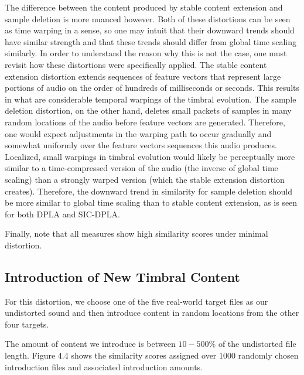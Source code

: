 \documentclass[a4paper,12pt]{report} 	%
\numberwithin{figure}{chapter}
\numberwithin{table}{chapter}
\numberwithin{equation}{chapter}
\begin{document}
\begin{flushleft}
The difference between the content produced by stable content extension and sample deletion is more nuanced however. Both of these distortions can be seen as time warping in a sense, so one may intuit that their downward trends should have similar strength and that these trends should differ from global time scaling similarly. In order to understand the reason why this is not the case, one must revisit how these distortions were specifically applied. The stable content extension distortion extends sequences of feature vectors that represent large portions of audio on the order of hundreds of milliseconds or seconds. This results in what are considerable temporal warpings of the timbral evolution. The sample deletion distortion, on the other hand, deletes small packets of samples in many random locations of the audio before feature vectors are generated. Therefore, one would expect adjustments in the warping path to occur gradually and somewhat uniformly over the feature vectors sequences this audio produces. Localized, small warpings in timbral evolution would likely be perceptually more similar to a time-compressed version of the audio (the inverse of global time scaling) than a strongly warped version (which the stable extension distortion creates). Therefore, the downward trend in similarity for sample deletion should be more similar to global time scaling than to stable content extension, as is seen for both DPLA and SIC-DPLA.

Finally, note that all measures show high similarity scores under minimal distortion.

\subsection{Introduction of New Timbral Content}
For this distortion, we choose one of the five real-world target files as our undistorted sound and then introduce content in random locations from the other four targets. 

The amount of content we introduce is between $10-500\%$ of the undistorted file length. Figure 4.4 shows the similarity scores assigned over $1000$ randomly chosen introduction files and associated introduction amounts.


\end{flushleft}
\end{document}
